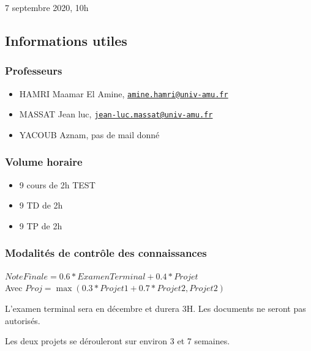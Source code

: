 

7 septembre 2020, 10h

\hypertarget{informations-utiles}{%
\subsection{Informations utiles}\label{informations-utiles}}

\hypertarget{professeurs}{%
\subsubsection{Professeurs}\label{professeurs}}

\begin{itemize}
\tightlist
\item
  HAMRI Maamar El Amine,
  \href{mailto:amine.hamri@univ-amu.fr}{\nolinkurl{amine.hamri@univ-amu.fr}}
\item
  MASSAT Jean luc,
  \href{mailto:jean-luc.massat@univ-amu.fr}{\nolinkurl{jean-luc.massat@univ-amu.fr}}
\item
  YACOUB Aznam, pas de mail donné
\end{itemize}

\hypertarget{volume-horaire}{%
\subsubsection{Volume horaire}\label{volume-horaire}}

\begin{itemize}
\tightlist
\item
  9 cours de 2h TEST
\item
  9 TD de 2h
\item
  9 TP de 2h
\end{itemize}

\hypertarget{modalituxe9s-de-contruxf4le-des-connaissances}{%
\subsubsection{Modalités de contrôle des
connaissances}\label{modalituxe9s-de-contruxf4le-des-connaissances}}

\(NoteFinale = 0.6 * ExamenTerminal + 0.4 * Projet\) \\

Avec \(Proj = \max(0.3 * Projet1 + 0.7 * Projet2, Projet2)\)

L'examen terminal sera en décembre et durera 3H. Les documents ne seront
pas autorisés.

Les deux projets se dérouleront sur environ 3 et 7 semaines.

